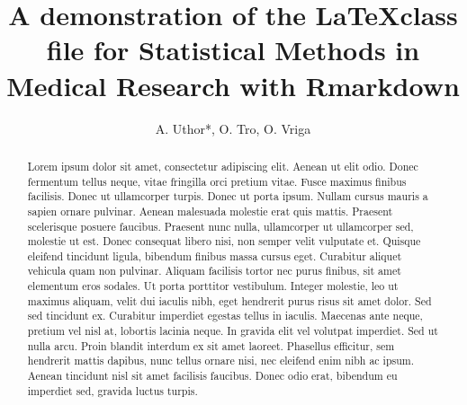 \documentclass[Royal,times,sageh]{sagej}
\begin{document}
\title{A demonstration of the \LaTeX class file for Statistical Methods in
Medical Research with Rmarkdown}


\author{A. Uthor*, O. Tro, O. Vriga}




\begin{abstract}
Lorem ipsum dolor sit amet, consectetur adipiscing elit. Aenean ut elit
odio. Donec fermentum tellus neque, vitae fringilla orci pretium vitae.
Fusce maximus finibus facilisis. Donec ut ullamcorper turpis. Donec ut
porta ipsum. Nullam cursus mauris a sapien ornare pulvinar. Aenean
malesuada molestie erat quis mattis. Praesent scelerisque posuere
faucibus. Praesent nunc nulla, ullamcorper ut ullamcorper sed, molestie
ut est. Donec consequat libero nisi, non semper velit vulputate et.
Quisque eleifend tincidunt ligula, bibendum finibus massa cursus eget.
Curabitur aliquet vehicula quam non pulvinar. Aliquam facilisis tortor
nec purus finibus, sit amet elementum eros sodales. Ut porta porttitor
vestibulum. Integer molestie, leo ut maximus aliquam, velit dui iaculis
nibh, eget hendrerit purus risus sit amet dolor. Sed sed tincidunt ex.
Curabitur imperdiet egestas tellus in iaculis. Maecenas ante neque,
pretium vel nisl at, lobortis lacinia neque. In gravida elit vel
volutpat imperdiet. Sed ut nulla arcu. Proin blandit interdum ex sit
amet laoreet. Phasellus efficitur, sem hendrerit mattis dapibus, nunc
tellus ornare nisi, nec eleifend enim nibh ac ipsum. Aenean tincidunt
nisl sit amet facilisis faucibus. Donec odio erat, bibendum eu imperdiet
sed, gravida luctus turpis.
\end{abstract}


\maketitle
\end{document}

